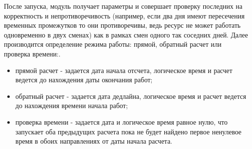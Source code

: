 \indent После запуска, модуль получает параметры и совершает проверку последних на корректность и непротиворечивость (например, если два дня имеют пересечения временных промежутков то они противоречивы, ведь ресурс не может работать одновременно в двух сменах) как в рамках смен одного так соседних дней.
Далее производится определение режима работы: прямой, обратный расчет или проверка времени:.
\begin{itemize}
	\item прямой расчет - задается дата начала отсчета, логическое время и расчет ведется до нахождения даты окончания работ;
	\item обратный расчет - задается дата дедлайна, логическое время и расчет ведется до нахождения времени начала работ;
	\item проверка времени - задается дата и логическое время равное нулю, что запускает оба предыдущих расчета пока не будет найдено первое ненулевое время в обоих направлениях от даты начала расчета.
\end{itemize}

